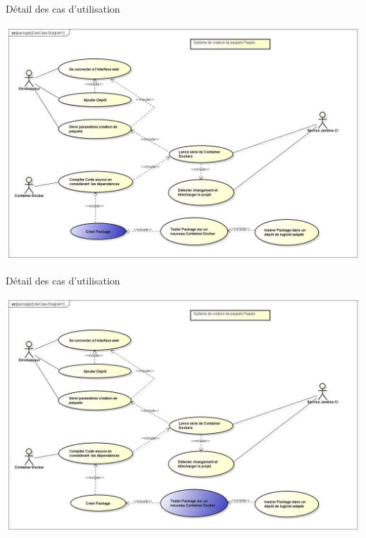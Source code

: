 \documentclass[11pt,xcolor=dvipsnames]{beamer}
\begin{document}
\begin{frame}{Détail des cas d'utilisation}
	\begin{center}	
		\includegraphics[scale=\largeur]{../img/Diagram8.jpg}
	\end{center}
\end{frame}

\begin{frame}{Détail des cas d'utilisation}
	\begin{center}	
		\includegraphics[scale=\largeur]{../img/Diagram9.jpg}
	\end{center}
\end{frame}
\end{document}

